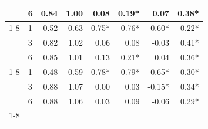 \begin{table}
\begin{tabular}{llrrrrrr}
 & 6 & 0.84 & 1.00 & 0.08 & 0.19* & 0.07 & 0.38* \\
\cline{1-8}
\multirow[t]{3}{*}{rf} & 1 & 0.52 & 0.63 & 0.75* & 0.76* & 0.60* & 0.22* \\
 & 3 & 0.82 & 1.02 & 0.06 & 0.08 & -0.03 & 0.41* \\
 & 6 & 0.85 & 1.01 & 0.13 & 0.21* & 0.04 & 0.36* \\
\cline{1-8}
\multirow[t]{3}{*}{xgboost} & 1 & 0.48 & 0.59 & 0.78* & 0.79* & 0.65* & 0.30* \\
 & 3 & 0.88 & 1.07 & 0.00 & 0.03 & -0.15* & 0.34* \\
 & 6 & 0.88 & 1.06 & 0.03 & 0.09 & -0.06 & 0.29* \\
\cline{1-8}
\bottomrule
\end{tabular}
\end{table}

